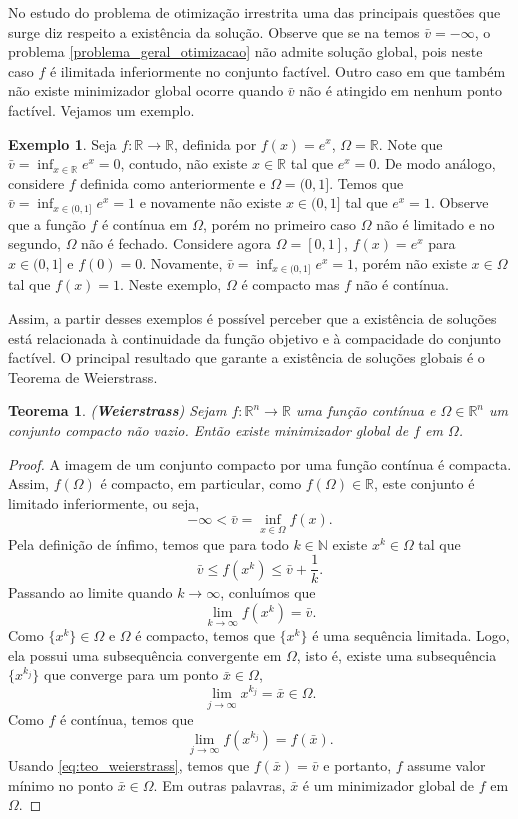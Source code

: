 \documentclass[12pt,a4paper]{scrartcl}
\def\RR{\mathds{R}}
\newtheorem{teo}{Teorema}
\theoremstyle{definition}%
\newtheorem{exem}{Exemplo}
\begin{document}
No estudo do problema de otimização irrestrita uma das principais questões que surge diz respeito a existência da solução. Observe que se na  temos $\bar{v} = - \infty$, o problema \eqref{problema_geral_otimizacao} não admite solução global, pois neste caso $f$ é ilimitada inferiormente no conjunto factível. Outro caso em que também não existe minimizador global ocorre quando $\bar{v}$ não é atingido em nenhum ponto factível. Vejamos um exemplo.

\begin{exem}
Seja $f: \RR \rightarrow \RR$, definida por $f(x) = e^{x}$, $\Omega = \RR$. Note que $\bar{v} = \inf_{x \in \RR} e^{x} = 0$, contudo, não existe $x \in \RR$ tal que $e^{x} = 0$. 
De modo análogo, considere $f$ definida como anteriormente e $\Omega = (0,1]$. Temos que $\bar{v} = \inf_{x \in (0,1]} e^{x} = 1$ e novamente não existe $x \in (0,1]$ tal que $e^{x}=1$. Observe que a função $f$ é contínua em $\Omega$, porém no primeiro caso $\Omega$ não é limitado e no segundo, $\Omega$ não é fechado. 
Considere agora $\Omega = [0,1]$, $f(x)=e^{x}$ para $x \in (0,1]$ e $f(0)=0$. Novamente, $\bar{v} = \inf_{x \in (0,1]} e^{x} = 1$, porém não existe $x\in \Omega$ tal que $f(x)=1$. Neste exemplo, $\Omega$ é compacto mas $f$ não é contínua.
\end{exem}

Assim, a partir desses exemplos é possível perceber que a existência de soluções está relacionada à continuidade da função objetivo e à compacidade do conjunto factível. O principal resultado que garante a existência de soluções globais é o Teorema de Weierstrass.

\begin{teo}(\textbf{Weierstrass}) \label{teo:weierstrass}
Sejam $f: \RR^{n} \rightarrow \RR$ uma função contínua e $\Omega \in \RR^{n}$ um conjunto compacto não vazio. Então existe minimizador global de $f$ em $\Omega$.
\end{teo}
\begin{proof}
A imagem de um conjunto compacto por uma função contínua é compacta. Assim, $f(\Omega)$ é compacto, em particular, como $f(\Omega) \in \RR$, este conjunto é limitado inferiormente, ou seja,
\[
-\infty < \bar{v} = \inf_{x\in \Omega} f(x).
\]
Pela definição de ínfimo, temos que para todo $k\in \mathds{N}$ existe $x^{k} \in \Omega$ tal que 
\[
\bar{v} \leq f(x^{k}) \leq \bar{v} + \dfrac{1}{k} .
\]
Passando ao limite quando $k \rightarrow \infty $, conluímos que
\[\label{eq:teo_weierstrass}
\lim_{k \rightarrow \infty} f(x^{k}) = \bar{v}.
\]
Como $\{ x^{k} \} \in \Omega$ e $\Omega$ é compacto, temos que $\{ x^{k} \}$ é uma sequência limitada. Logo, ela possui uma subsequência convergente em $\Omega$, isto é, existe uma subsequência $\{ x^{k_{j}} \}$ que converge para um ponto $\bar{x} \in \Omega$,
\[
\lim_{j \rightarrow \infty} x^{k_{j}} = \bar{x} \in \Omega .
\]
Como $f$ é contínua, temos que
\[
\lim_{j \rightarrow \infty} f(x^{k_{j}}) = f(\bar{x}).
\]
Usando \eqref{eq:teo_weierstrass}, temos que $f(\bar{x}) = \bar{v}$ e portanto, $f$ assume valor mínimo no ponto $\bar{x} \in \Omega$. Em outras palavras, $\bar{x}$ é um minimizador global de $f$ em $\Omega$.
\end{proof}
\end{document}
